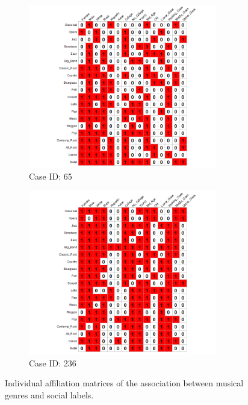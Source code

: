\documentclass[12pt]{article}
\begin{document}
\begin{figure}[ht!]
    \captionsetup[subfigure]{font=footnotesize,labelfont=footnotesize}
    \centering
     \begin{subfigure}[b]{0.49\textwidth}
        \includegraphics[trim={4cm 0cm 3cm 0cm},clip, width=0.9\textwidth]{Plots/data-ex-af1.png}
            \caption{Case ID: 65}
            \label{fig:ind-ex-aff1}
    \end{subfigure}
     \begin{subfigure}[b]{0.49\textwidth}
        \includegraphics[trim={4cm 0cm 3cm 0cm},clip, width=0.9\textwidth]{Plots/data-ex-af2.png}
            \caption{Case ID: 236}
            \label{fig:ind-ex-aff2}
    \end{subfigure}
    \caption{Individual affiliation matrices of the association between musical genres and social labels.}
    \label{fig:ind-ex-aff}
\end{figure}
\end{document}

